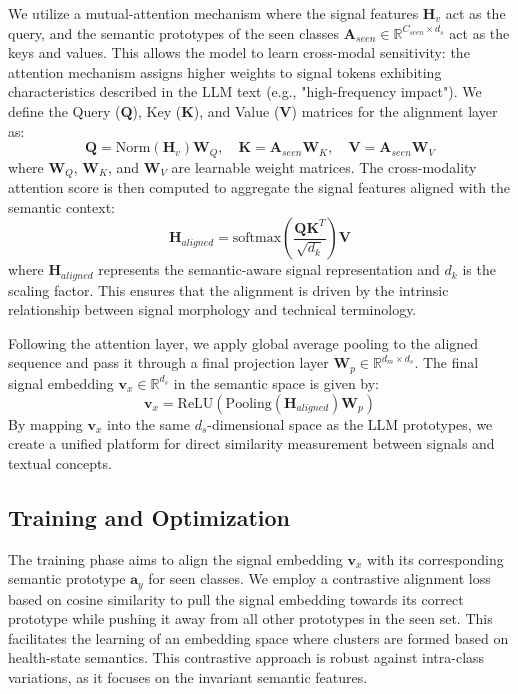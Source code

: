\documentclass[journal]{IEEEtran}
\begin{document}
We utilize a mutual-attention mechanism where the signal features $\mathbf{H}_v$ act as the query, and the semantic prototypes of the seen classes $\mathbf{A}_{seen} \in \mathbb{R}^{C_{seen} \times d_s}$ act as the keys and values. This allows the model to learn cross-modal sensitivity: the attention mechanism assigns higher weights to signal tokens exhibiting characteristics described in the LLM text (e.g., "high-frequency impact"). We define the Query ($\mathbf{Q}$), Key ($\mathbf{K}$), and Value ($\mathbf{V}$) matrices for the alignment layer as:
\begin{equation}
\mathbf{Q} = \text{Norm}(\mathbf{H}_v) \mathbf{W}_Q, \quad \mathbf{K} = \mathbf{A}_{seen} \mathbf{W}_K, \quad \mathbf{V} = \mathbf{A}_{seen} \mathbf{W}_V
\end{equation}
where $\mathbf{W}_Q$, $\mathbf{W}_K$, and $\mathbf{W}_V$ are learnable weight matrices. The cross-modality attention score is then computed to aggregate the signal features aligned with the semantic context:
\begin{equation}
\mathbf{H}_{aligned} = \text{softmax}\left(\frac{\mathbf{Q}\mathbf{K}^T}{\sqrt{d_k}}\right) \mathbf{V}
\end{equation}
where $\mathbf{H}_{aligned}$ represents the semantic-aware signal representation and $d_k$ is the scaling factor. This ensures that the alignment is driven by the intrinsic relationship between signal morphology and technical terminology.

Following the attention layer, we apply global average pooling to the aligned sequence and pass it through a final projection layer $\mathbf{W}_p \in \mathbb{R}^{d_m \times d_s}$. The final signal embedding $\mathbf{v}_x \in \mathbb{R}^{d_s}$ in the semantic space is given by:
\begin{equation}
\mathbf{v}_x = \text{ReLU}(\text{Pooling}(\mathbf{H}_{aligned}) \mathbf{W}_p)
\end{equation}
By mapping $\mathbf{v}_x$ into the same $d_s$-dimensional space as the LLM prototypes, we create a unified platform for direct similarity measurement between signals and textual concepts.

\subsection{Training and Optimization}
The training phase aims to align the signal embedding $\mathbf{v}_x$ with its corresponding semantic prototype $\mathbf{a}_{y}$ for seen classes. We employ a contrastive alignment loss \cite{chen2020simple} based on cosine similarity to pull the signal embedding towards its correct prototype while pushing it away from all other prototypes in the seen set. This facilitates the learning of an embedding space where clusters are formed based on health-state semantics. This contrastive approach is robust against intra-class variations, as it focuses on the invariant semantic features.
\end{document}
